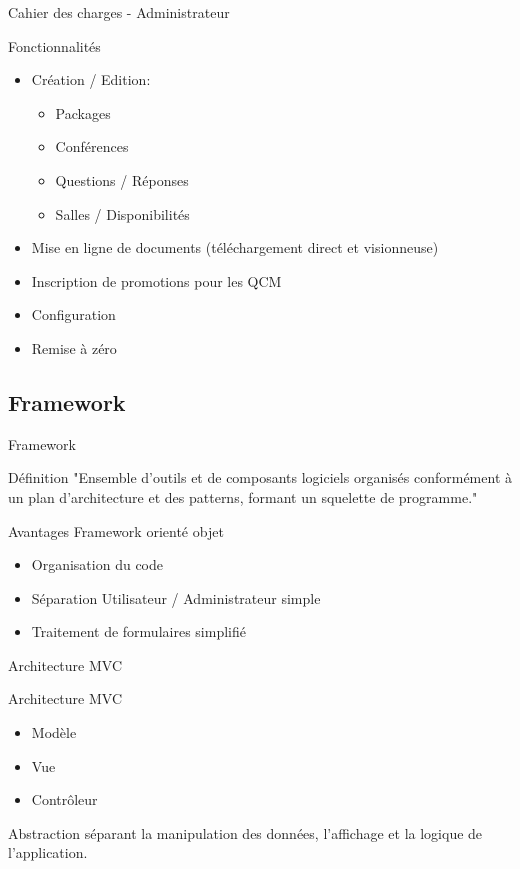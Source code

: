 \begin{frame}{Cahier des charges - Administrateur}
    \begin{block}{Fonctionnalités}
    \begin{itemize}
    \item Création / Edition:
            \begin{itemize}
            \item Packages
            \item Conférences
            \item Questions / Réponses
            \item Salles / Disponibilités
            \end{itemize}
    \item Mise en ligne de documents (téléchargement direct et visionneuse)
    \item Inscription de promotions pour les QCM
    \item Configuration
    \item Remise à zéro
    \end{itemize}
    \end{block}
\end{frame}

\subsection{Framework}
\begin{frame}{Framework}
    \begin{block}{Définition}
    "Ensemble d'outils et de composants logiciels organisés conformément à un plan d'architecture et des patterns, formant un squelette de programme."
    \end{block}

    \begin{block}{Avantages}
    Framework orienté objet
    \begin{itemize}
    \item Organisation du code
    \item Séparation Utilisateur / Administrateur simple
    \item Traitement de formulaires simplifié
    \end{itemize}
    \end{block}
\end{frame}

\begin{frame}{Architecture MVC}
    \begin{block}{Architecture MVC}
    \begin{itemize}
    \item Modèle
    \item Vue
    \item Contrôleur
    \end{itemize}
    Abstraction séparant la manipulation des données, l'affichage et la logique de l'application.
    \end{block}
\end{frame}


